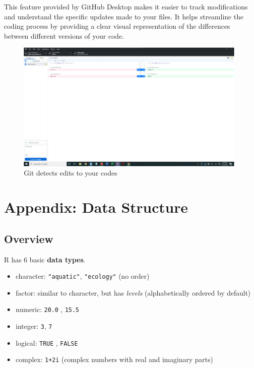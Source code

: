 \documentclass[
]{article}
\providecommand{\tightlist}{%
  \setlength{\itemsep}{0pt}\setlength{\parskip}{0pt}}
\begin{document}
This feature provided by GitHub Desktop makes it easier to track modifications and understand the specific updates made to your files. It helps streamline the coding process by providing a clear visual representation of the differences between different versions of your code.

\begin{figure}

{\centering \includegraphics[width=61.11in]{image/git_image06} 

}

\caption{Git detects edits to your codes}\label{fig:gitdesktop5}
\end{figure}

\hypertarget{appendix-data-structure}{%
\section{Appendix: Data Structure}\label{appendix-data-structure}}

\hypertarget{overview}{%
\subsection{Overview}\label{overview}}

R has 6 basic \textbf{data types}.

\begin{itemize}
\tightlist
\item
  character: \texttt{"aquatic"}, \texttt{"ecology"} (no order)
\item
  factor: similar to character, but has \emph{levels} (alphabetically ordered by default)
\item
  numeric: \texttt{20.0} , \texttt{15.5}
\item
  integer: \texttt{3}, \texttt{7}
\item
  logical: \texttt{TRUE} , \texttt{FALSE}
\item
  complex: \texttt{1+2i} (complex numbers with real and imaginary parts)
\end{itemize}
\end{document}

